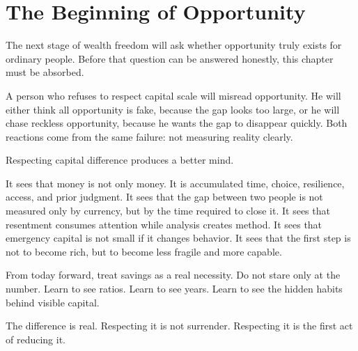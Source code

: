\section*{The Beginning of Opportunity}

The next stage of wealth freedom will ask whether opportunity truly exists for ordinary people. Before that question can be answered honestly, this chapter must be absorbed.

A person who refuses to respect capital scale will misread opportunity. He will either think all opportunity is fake, because the gap looks too large, or he will chase reckless opportunity, because he wants the gap to disappear quickly. Both reactions come from the same failure: not measuring reality clearly.

Respecting capital difference produces a better mind.

It sees that money is not only money. It is accumulated time, choice, resilience, access, and prior judgment. It sees that the gap between two people is not measured only by currency, but by the time required to close it. It sees that resentment consumes attention while analysis creates method. It sees that emergency capital is not small if it changes behavior. It sees that the first step is not to become rich, but to become less fragile and more capable.

From today forward, treat savings as a real necessity. Do not stare only at the number. Learn to see ratios. Learn to see years. Learn to see the hidden habits behind visible capital.

The difference is real. Respecting it is not surrender. Respecting it is the first act of reducing it.
